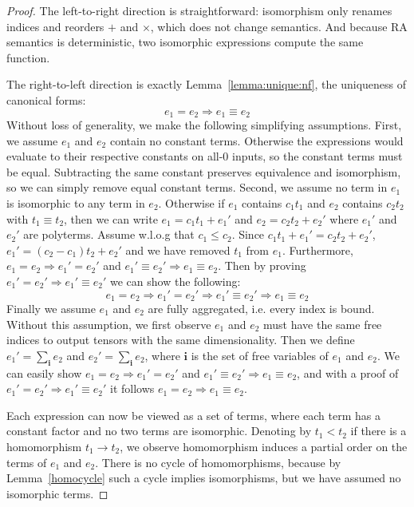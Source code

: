 \documentclass{article}
\begin{document}
\begin{proof}
The left-to-right direction is straightforward: isomorphism only renames indices and reorders $+$ and $\times$, which does not change semantics. And because RA semantics is deterministic, two isomorphic expressions compute the same function. 

The right-to-left direction is exactly Lemma~\ref{lemma:unique:nf}, the uniqueness of canonical forms: 
$$e_1  = e_2  \Rightarrow e_1  \equiv e_2 $$
Without loss of generality, we make the following simplifying assumptions. First, we assume $e_1$ and $e_2$ contain no constant terms. Otherwise the expressions would evaluate to their respective constants on all-0 inputs, so the constant terms must be equal. Subtracting the same constant preserves equivalence and isomorphism, so we can simply remove equal constant terms. 
Second, we assume no term in $e_1$ is isomorphic to any term in $e_2$. 
Otherwise if $e_1$ contains $c_1t_1$ and $e_2$ contains $c_2t_2$ with $t_1 \equiv t_2$, then we can write $e_1 = c_1 t_1 + e_1'$ and $e_2 = c_2 t_2 + e_2'$ where $e_1'$ and $e_2'$ are polyterms. Assume w.l.o.g that $c_1 \leq c_2$. Since $c_1t_1 + e_1' = c_2 t_2 + e_2'$, $e_1' = (c_2 - c_1)t_2 +e_2'$ and we have removed $t_1$ from $e_1$. 
Furthermore, $e_1 = e_2 \Rightarrow e_1' = e_2'$ and $e_1' \equiv e_2' \Rightarrow e_1 \equiv e_2$. 
Then by proving $e_1' = e_2' \Rightarrow  e_1' \equiv e_2'$ we can show the following:
$$e_1 = e_2 \Rightarrow e_1' = e_2' \Rightarrow  e_1' \equiv e_2' \Rightarrow e_1 \equiv e_2$$
Finally we assume $e_1$ and $e_2$ are fully aggregated, i.e. every index is bound. Without this assumption, we first observe $e_1$ and $e_2$ must have the same free indices to output tensors with the same dimensionality. Then we define $e_1' = \sum_{\pmb{i}} e_2$ and $e_2' = \sum_{\pmb{i}} e_2$, where $\pmb{i}$ is the set of free variables of $e_1$ and $e_2$. We can easily show $e_1 = e_2 \Rightarrow e_1' = e_2'$ and $e_1' \equiv e_2' \Rightarrow e_1 \equiv e_2$, and with a proof of $e_1' = e_2' \Rightarrow e_1' \equiv e_2'$ it follows $e_1 = e_2 \Rightarrow e_1 \equiv e_2$. 

Each expression can now be viewed as a set of terms, where each term has a constant factor and no two terms are isomorphic. Denoting by $t_1 < t_2$ if there is a homomorphism $t_1 \rightarrow t_2$, we observe homomorphism induces a partial order on the terms of $e_1$ and $e_2$. There is no cycle of homomorphisms, because by Lemma~\ref{homocycle} such a cycle implies isomorphisms, but we have assumed no isomorphic terms. 


\end{proof}
\end{document}
